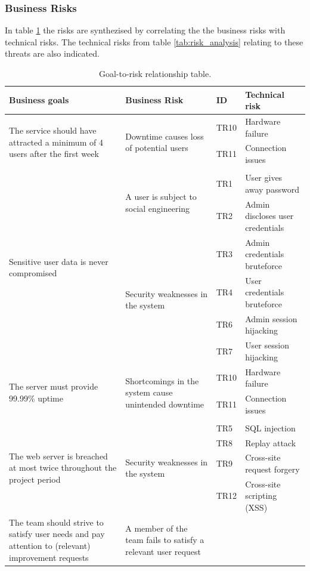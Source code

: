 \documentclass[a4paper]{article}
\begin{document}
\subsubsection{Business Risks}
In table \ref{tab:goal_to_risk_relationship} the risks are synthezised by correlating the the business risks with technical risks. The technical risks from table \ref{tab:risk_analysis} relating to these threats are also indicated.

\begin{table}[h!]
	\begin{tabular}{| p{4cm} | p{4cm}| l | l |}
    \hline
   	\textbf{Business goals} & \textbf{Business Risk} & \textbf{ID}  & \textbf{Technical risk} \\ \hline
    \multirow{3}{4cm}{The service should have attracted a minimum of 4 users after the first week} & \multirow{3}{4cm}{Downtime causes loss of potential users} & TR10 & Hardware failure \\ & & TR11 & Connection issues \\ & & & \\ \hline
    \multirow{6}{4cm}{Sensitive user data is never compromised} & \multirow{2}{4cm}{A user is subject to social engineering} & TR1 & User gives away password \\ & & TR2 & Admin discloses user credentials \\ & \multirow{4}{4cm}{Security weaknesses in the system} & TR3 & Admin credentials bruteforce \\ & & TR4 & User credentials bruteforce \\ & & TR6 & Admin session hijacking \\ & & TR7 & User session hijacking \\ \hline
    \multirow{3}{4cm}{The server must provide 99.99\% uptime} & \multirow{3}{4cm}{Shortcomings in the system cause unintended downtime} & TR10 & Hardware failure \\ & & TR11 & Connection issues \\ & & & \\ \hline
    \multirow{4}{4cm}{The web server is breached at most twice throughout the project period} & \multirow{4}{4cm}{Security weaknesses in the system} & TR5 & SQL injection \\ & & TR8 & Replay attack \\ & & TR9 & Cross-site request forgery \\ & & TR12 & Cross-site scripting (XSS) \\ \hline
    The team should strive to satisfy user needs and pay attention to (relevant) improvement requests & A member of the team fails to satisfy a relevant user request & & \\ \hline
    \end{tabular}
    \caption{Goal-to-risk relationship table.}
	\label{tab:goal_to_risk_relationship}
\end{table}
\end{document}
